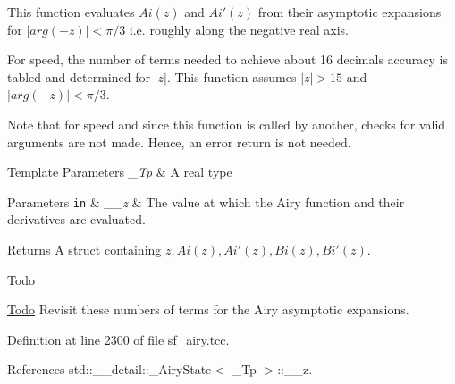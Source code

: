 This function evaluates $ Ai(z) $ and $ Ai'(z) $ from their asymptotic expansions for $ |arg(-z)| < \pi/3 $ i.\+e. roughly along the negative real axis. 

For speed, the number of terms needed to achieve about 16 decimals accuracy is tabled and determined for $ |z| $. This function assumes $ |z| > 15 $ and $ |arg(-z)| < \pi/3 $.

Note that for speed and since this function is called by another, checks for valid arguments are not made. Hence, an error return is not needed.


\begin{DoxyTemplParams}{Template Parameters}
{\em \+\_\+\+Tp} & A real type \\
\hline
\end{DoxyTemplParams}

\begin{DoxyParams}[1]{Parameters}
\mbox{\tt in}  & {\em \+\_\+\+\_\+z} & The value at which the Airy function and their derivatives are evaluated. \\
\hline
\end{DoxyParams}
\begin{DoxyReturn}{Returns}
A struct containing $ z, Ai(z), Ai'(z), Bi(z), Bi'(z) $. 
\end{DoxyReturn}
\begin{DoxyRefDesc}{Todo}
\item[\hyperlink{todo__todo000007}{Todo}]Revisit these numbers of terms for the Airy asymptotic expansions. \end{DoxyRefDesc}


Definition at line 2300 of file sf\+\_\+airy.\+tcc.



References std\+::\+\_\+\+\_\+detail\+::\+\_\+\+Airy\+State$<$ \+\_\+\+Tp $>$\+::\+\_\+\+\_\+z.

\mbox{\label{classstd_1_1____detail_1_1__Airy__asymp_a79ba1c14d03fad8369477baf39c62874}} 
